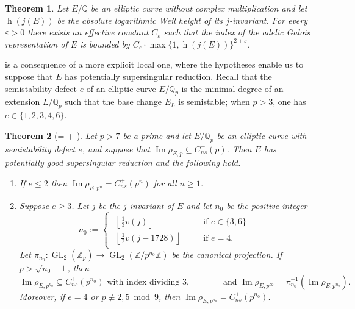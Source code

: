 \documentclass{amsart}
\newcommand{\Qp}{\mathbb{Q}_p}
\newtheorem{theorem}{Theorem}
\theoremstyle{definition}
\newcommand{\Z}{\mathbb{Z}}
\newcommand{\Q}{\mathbb{Q}}
\newcommand{\GL}{\operatorname{GL}}
\numberwithin{theorem}{section}
\numberwithin{equation}{section}
\begin{document}
\begin{theorem}\label{introthm: adelic bound}
    Let $E/\Q$ be an elliptic curve without complex multiplication and let $\operatorname{h}(j(E))$ be the absolute logarithmic Weil height of its $j$-invariant. For every $\varepsilon > 0$ there exists an effective constant $C_\varepsilon$ such that the index of the adelic Galois representation of $E$ is bounded by $C_\varepsilon \cdot \max\{1, \operatorname{h}(j(E))\}^{2+\varepsilon}$.
\end{theorem}


 is a consequence of a more explicit local one, where the hypotheses enable us to suppose that $E$ has potentially supersingular reduction. Recall that the semistability defect $e$ of an elliptic curve $E/\Qp$ is the minimal degree of an extension $L/\Qp$ such that the base change $E_L$ is semistable; when $p>3$, one has $e \in \{1,2,3,4,6\}$.

\begin{theorem}[= + ]\label{introthm: more precise description padic Galreps}
    Let $p>7$ be a prime and let $E/\Q_p$ be an elliptic curve with semistability defect $e$, and suppose that $\operatorname{Im}\rho_{E,p} \subseteq C_{ns}^+(p)$. Then $E$ has potentially good supersingular reduction and the following hold.
    \begin{enumerate}
        \item If $e\leq 2$ then $\operatorname{Im}\rho_{E,p^n} = C_{ns}^+(p^n)$ for all $n \geq 1$.
        \item Suppose $e \geq 3$. Let $j$ be the $j$-invariant of $E$ and let $n_0$ be the positive integer
    \[
    n_0 := \begin{cases}
    \begin{array}{lll}
    \!\left\lfloor \frac{1}{3}v(j) \right\rfloor & \quad & \text{if $e \in \{3,6\}$} \\
    \!\left\lfloor \frac{1}{2}v(j-1728) \right\rfloor & \quad & \text{if $e = 4$.}
    \end{array}
    \end{cases}
    \]
    Let $\pi_{n_0} : \GL_2(\Z_p) \to \GL_2(\Z/p^{n_0}\Z)$ be the canonical projection. If $p>\sqrt{n_0+1}$, then 
\[
\operatorname{Im}\rho_{E,p^{n_0}} \subseteq C_{ns}^+(p^{n_0}) \text{ with index dividing $3$,} \qquad\qquad \text{and} \,\, \operatorname{Im}\rho_{E,p^\infty} = \pi_{n_0}^{-1}(\operatorname{Im}\rho_{E,p^{n_0}}).
\]
Moreover, if $e=4$ or $p \not\equiv 2,5 \bmod 9$, then $\operatorname{Im}\rho_{E,p^{n_0}} = C_{ns}^+(p^{n_0})$. 
    \end{enumerate}
\end{theorem}
\end{document}
